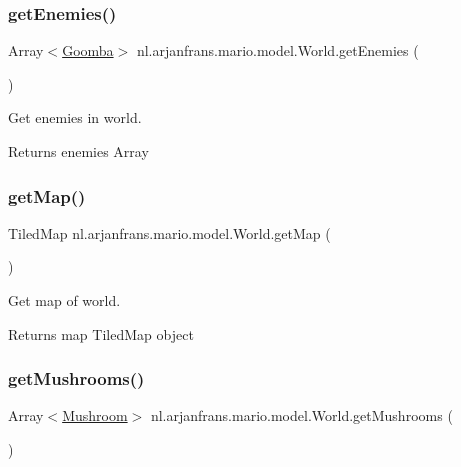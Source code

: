 \subsubsection{\texorpdfstring{get\+Enemies()}{getEnemies()}}
{\footnotesize\ttfamily Array$<$\hyperlink{classnl_1_1arjanfrans_1_1mario_1_1model_1_1Goomba}{Goomba}$>$ nl.\+arjanfrans.\+mario.\+model.\+World.\+get\+Enemies (\begin{DoxyParamCaption}{ }\end{DoxyParamCaption})}



Get enemies in world. 

\begin{DoxyReturn}{Returns}
enemies Array 
\end{DoxyReturn}
\mbox{\label{classnl_1_1arjanfrans_1_1mario_1_1model_1_1World_a8812c471d0f3e39ab3a0073527baf4d8}} 
\subsubsection{\texorpdfstring{get\+Map()}{getMap()}}
{\footnotesize\ttfamily Tiled\+Map nl.\+arjanfrans.\+mario.\+model.\+World.\+get\+Map (\begin{DoxyParamCaption}{ }\end{DoxyParamCaption})}



Get map of world. 

\begin{DoxyReturn}{Returns}
map Tiled\+Map object 
\end{DoxyReturn}
\mbox{\label{classnl_1_1arjanfrans_1_1mario_1_1model_1_1World_a3acf1e0b7bab1db92c5537fbd038f5c5}} 
\subsubsection{\texorpdfstring{get\+Mushrooms()}{getMushrooms()}}
{\footnotesize\ttfamily Array$<$\hyperlink{classnl_1_1arjanfrans_1_1mario_1_1model_1_1Mushroom}{Mushroom}$>$ nl.\+arjanfrans.\+mario.\+model.\+World.\+get\+Mushrooms (\begin{DoxyParamCaption}{ }\end{DoxyParamCaption})}



